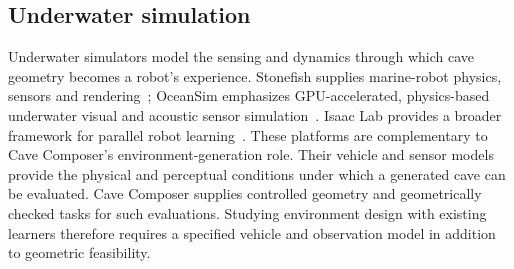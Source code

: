 \subsection{Underwater simulation}
Underwater simulators model the sensing and dynamics through which cave geometry
becomes a robot's experience. Stonefish supplies marine-robot physics, sensors
and rendering~\cite{cieslak2019stonefish}; OceanSim emphasizes GPU-accelerated,
physics-based underwater visual and acoustic sensor
simulation~\cite{song2025oceansim}. Isaac Lab provides a broader framework for
parallel robot learning~\cite{nvidia2025isaaclab}. These platforms are
complementary to Cave Composer's environment-generation role. Their vehicle and
sensor models provide the physical and perceptual conditions under which a
generated cave can be evaluated. Cave Composer supplies controlled geometry and
geometrically checked tasks for such evaluations. Studying environment design
with existing learners therefore requires a specified vehicle and observation
model in addition to geometric feasibility.
